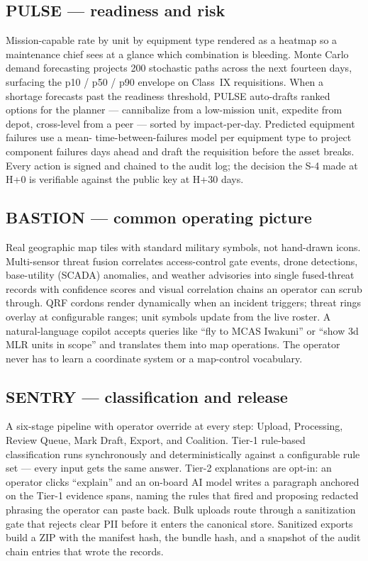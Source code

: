 \documentclass[10.5pt]{extarticle}
\begin{document}
\subsection*{PULSE --- readiness and risk}
Mission-capable rate by unit by equipment type rendered as a heatmap so
a maintenance chief sees at a glance which combination is bleeding.
Monte Carlo demand forecasting projects 200 stochastic paths across the
next fourteen days, surfacing the p10 / p50 / p90 envelope on Class~IX
requisitions. When a shortage forecasts past the readiness threshold,
PULSE auto-drafts ranked options for the planner --- cannibalize from
a low-mission unit, expedite from depot, cross-level from a peer ---
sorted by impact-per-day. Predicted equipment failures use a mean-
time-between-failures model per equipment type to project component
failures days ahead and draft the requisition before the asset breaks.
Every action is signed and chained to the audit log; the decision the
S-4 made at H+0 is verifiable against the public key at H+30 days.

\subsection*{BASTION --- common operating picture}
Real geographic map tiles with standard military symbols, not
hand-drawn icons. Multi-sensor threat fusion correlates access-control
gate events, drone detections, base-utility (SCADA) anomalies, and
weather advisories into single fused-threat records with confidence
scores and visual correlation chains an operator can scrub through.
QRF cordons render dynamically when an incident triggers; threat rings
overlay at configurable ranges; unit symbols update from the live
roster. A natural-language copilot accepts queries like ``fly to MCAS
Iwakuni'' or ``show 3d MLR units in scope'' and translates them into
map operations. The operator never has to learn a coordinate system or
a map-control vocabulary.

\subsection*{SENTRY --- classification and release}
A six-stage pipeline with operator override at every step: Upload,
Processing, Review Queue, Mark Draft, Export, and Coalition. Tier-1
rule-based classification runs synchronously and deterministically
against a configurable rule set --- every input gets the same answer.
Tier-2 explanations are opt-in: an operator clicks ``explain'' and an
on-board AI model writes a paragraph anchored on the Tier-1 evidence
spans, naming the rules that fired and proposing redacted phrasing the
operator can paste back. Bulk uploads route through a sanitization gate
that rejects clear PII before it enters the canonical store. Sanitized
exports build a ZIP with the manifest hash, the bundle hash, and a
snapshot of the audit chain entries that wrote the records.
\end{document}
